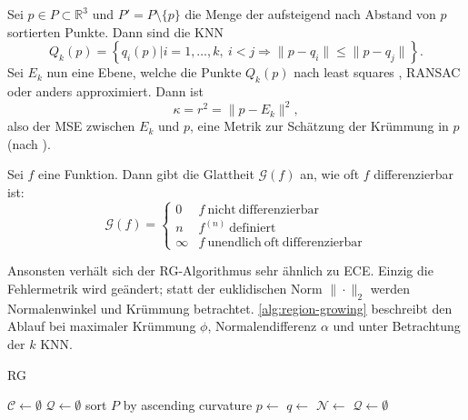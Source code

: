 \begin{definition}
Sei $p \in P \subset \mathbb{R}^3$ und $P' = P \setminus \{p\}$ die Menge der aufsteigend nach Abstand von $p$ sortierten Punkte.
Dann sind die \acl{KNN}
$$
Q_k(p) = \left\{ q_i(p) | i = 1, \dots, k,\ i < j \Rightarrow \|p - q_i\| \leq \|p - q_j\| \right\}.
$$
Sei $E_k$ nun eine Ebene, welche die Punkte $Q_k(p)$ nach least squares \cite{schomaker1959fit}, RANSAC \cite{fischler1981random} oder anders approximiert.
Dann ist
\begin{equation}
\label{eq:kruemmung}
\kappa = r^2 = \|p - E_k\|^2,
\end{equation}
also der \ac{MSE} zwischen $E_k$ und $p$, eine Metrik zur Schätzung der Krümmung in $p$ (nach \cite[Abs. 2.1.2]{rabbani2006segmentation}).
\end{definition}

\begin{definition}
\label{def:glattheit}
Sei $f$ eine Funktion.
Dann gibt die Glattheit $\mathcal{G}(f)$ an, wie oft $f$ differenzierbar ist:
\begin{equation}
\mathcal{G}(f) = \left\{\begin{array}{ll}
0 & f\ \mathrm{nicht\ differenzierbar}\\
n & f^{(n)}\ \mathrm{definiert}\\
\infty & f\ \mathrm{unendlich\ oft\ differenzierbar}
\end{array}\right.
\end{equation}
\end{definition}

Ansonsten verhält sich der \ac{RG}-Algorithmus sehr ähnlich zu \ac{ECE}.
Einzig die Fehlermetrik wird geändert; statt der euklidischen Norm $\|\cdot\|_2$ werden Normalenwinkel und Krümmung betrachtet.
\autoref{alg:region-growing} beschreibt den Ablauf bei maximaler Krümmung $\phi$, Normalendifferenz $\alpha$ und unter Betrachtung der $k$ \ac{KNN}.

\begin{algorithm}[H]
\caption{\acl{RG}}
\label{alg:region-growing}
\begin{algorithmic}
\State $\mathcal{C} \gets \emptyset$
\State $\mathcal{Q} \gets \emptyset$
\State sort $P$ by ascending curvature
	\State $p \gets$ 
	\State {}
		\State $q \gets$ 
		\State $\mathcal{N} \gets$ 
				\State {}
				\State {}
			\EndIf
		\EndFor
	\EndWhile
	\State {}
	\State $\mathcal{Q} \gets \emptyset$
\EndWhile
\State {}
\end{algorithmic}
\end{algorithm}


